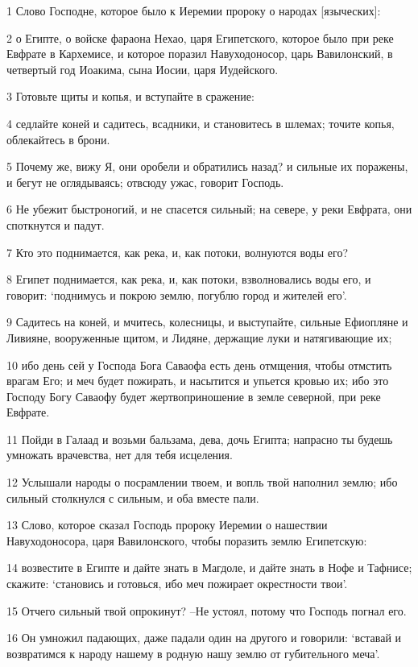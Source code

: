 \par 1 Слово Господне, которое было к Иеремии пророку о народах [языческих]:
\par 2 о Египте, о войске фараона Нехао, царя Египетского, которое было при реке Евфрате в Кархемисе, и которое поразил Навуходоносор, царь Вавилонский, в четвертый год Иоакима, сына Иосии, царя Иудейского.
\par 3 Готовьте щиты и копья, и вступайте в сражение:
\par 4 седлайте коней и садитесь, всадники, и становитесь в шлемах; точите копья, облекайтесь в брони.
\par 5 Почему же, вижу Я, они оробели и обратились назад? и сильные их поражены, и бегут не оглядываясь; отвсюду ужас, говорит Господь.
\par 6 Не убежит быстроногий, и не спасется сильный; на севере, у реки Евфрата, они споткнутся и падут.
\par 7 Кто это поднимается, как река, и, как потоки, волнуются воды его?
\par 8 Египет поднимается, как река, и, как потоки, взволновались воды его, и говорит: `поднимусь и покрою землю, погублю город и жителей его'.
\par 9 Садитесь на коней, и мчитесь, колесницы, и выступайте, сильные Ефиопляне и Ливияне, вооруженные щитом, и Лидяне, держащие луки и натягивающие их;
\par 10 ибо день сей у Господа Бога Саваофа есть день отмщения, чтобы отмстить врагам Его; и меч будет пожирать, и насытится и упьется кровью их; ибо это Господу Богу Саваофу будет жертвоприношение в земле северной, при реке Евфрате.
\par 11 Пойди в Галаад и возьми бальзама, дева, дочь Египта; напрасно ты будешь умножать врачевства, нет для тебя исцеления.
\par 12 Услышали народы о посрамлении твоем, и вопль твой наполнил землю; ибо сильный столкнулся с сильным, и оба вместе пали.
\par 13 Слово, которое сказал Господь пророку Иеремии о нашествии Навуходоносора, царя Вавилонского, чтобы поразить землю Египетскую:
\par 14 возвестите в Египте и дайте знать в Магдоле, и дайте знать в Нофе и Тафнисе; скажите: `становись и готовься, ибо меч пожирает окрестности твои'.
\par 15 Отчего сильный твой опрокинут? --Не устоял, потому что Господь погнал его.
\par 16 Он умножил падающих, даже падали один на другого и говорили: `вставай и возвратимся к народу нашему в родную нашу землю от губительного меча'.
